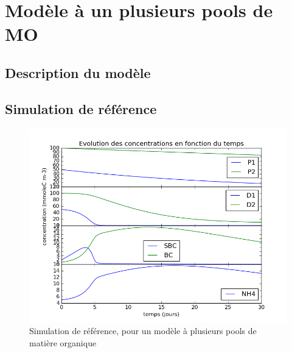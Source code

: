 \section{Mod\`ele \`a un plusieurs pools de MO}
\subsection{Description du mod\`ele}

\subsection{Simulation de r\'ef\'erence}

\begin{figure}[h!]
  \includegraphics[width=\textwidth]{partie2/Ref.png}
  \caption{Simulation de r\'ef\'erence, pour un mod\`ele \`a plusieurs pools de mati\`ere organique
  }
  \label{fig:partie2ref}
\end{figure}

